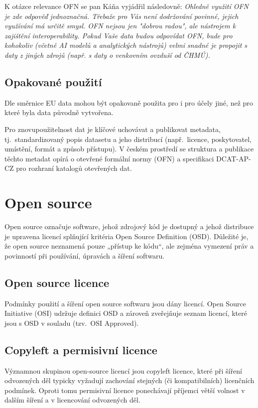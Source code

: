 K otázce relevance OFN se pan Káňa vyjádřil následovně: \textit{ Ohledně využití OFN je zde odpověď jednoznačná. Třebaže pro Vás není dodržování povinné, jejich využívání má určitě smysl. OFN nejsou jen "dobrou radou", ale nástrojem k zajištění interoperability. Pokud Vaše data budou odpovídat OFN, bude pro kohokoliv (včetně AI modelů a analytických nástrojů) velmi snadné je propojit s daty z jiných zdrojů (např. s daty o venkovním ovzduší od ČHMÚ).}

\subsection{Opakované použití}
Dle směrnice EU data mohou být opakovaně použita pro i pro účely jiné, než pro které byla data původně vytvořena. \parencite[čl. 2 odst. 11]{SmerniceEvropskehoParlamentu2019}

Pro znovupoužitelnost dat je klíčové uchovávat a publikovat metadata, tj.~standardizovaný popis datasetu a jeho distribucí (např.~licence, poskytovatel, umístění, formát a způsob přístupu). V českém prostředí se struktura a publikace těchto metadat opírá o otevřené formální normy (OFN) a specifikaci DCAT-AP-CZ pro rozhraní katalogů otevřených dat. \parencite{OtevreneFormalniNormy,DCATAPCZRozhraniKatalogu}

\section{Open source}

Open source označuje software, jehož zdrojový kód je dostupný a jehož distribuce je upravena licencí splňující kritéria Open Source Definition (OSD). Důležité je, že open source neznamená pouze „přístup ke kódu“, ale zejména vymezení práv a povinností při používání, úpravách a šíření softwaru. \parencite{OpenSourceDefinition,OpenSource2024}

\subsection{Open source licence}
Podmínky použití a šíření open source softwaru jsou dány licencí. Open Source Initiative (OSI) udržuje definici OSD a zároveň zveřejňuje seznam licencí, které jsou s OSD v souladu (tzv.~OSI Approved). \parencite{OpenSourceDefinition,OSILicenses}

\subsection{Copyleft a permisivní licence}
Významnou skupinou open-source licencí jsou copyleft licence, které při šíření odvozených děl typicky vyžadují zachování stejných (či kompatibilních) licenčních podmínek. Oproti tomu permisivní licence ponechávají příjemci větší volnost v dalším šíření a v licencování odvozených děl. \parencite{Copyleft2026}


